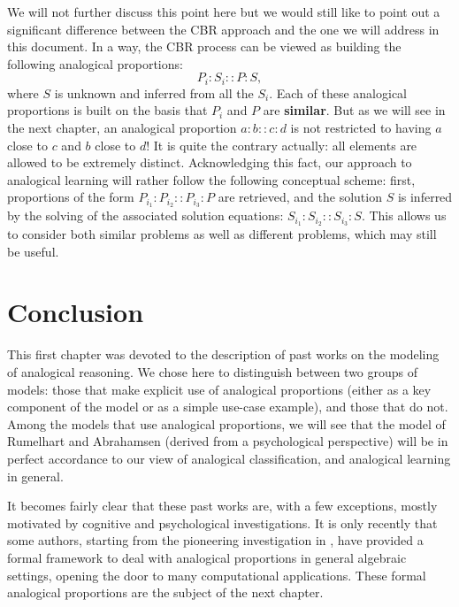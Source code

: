 We will not further discuss this point here but we would still like to point out a
significant difference between the CBR approach and the one we will address in
this document. In a way, the CBR process can be viewed as building the
following analogical proportions:
$$P_i:S_i :: P : S, $$
where $S$ is unknown and inferred from all the $S_i$. Each of these analogical
proportions is built on the basis that $P_i$ and $P$ are \textbf{similar}. But
as we will see in the next chapter, an analogical proportion $a:b::c:d$ is not
restricted to having $a$ close to $c$ and $b$ close to $d$! It is quite the
contrary actually: all elements are allowed to be extremely distinct.
Acknowledging this fact, our approach to analogical learning will rather follow
the following conceptual scheme: first, proportions of the form $P_{i_1} :
P_{i_2} :: P_{i_3} : P$ are retrieved, and the solution $S$ is inferred by the
solving of the associated solution equations: $S_{i_1} : S_{i_2} :: S_{i_3} :
S$. This allows us to consider both similar problems as well as different
problems, which may still be useful.

\section*{Conclusion}

This first chapter was devoted to the description of past works on the modeling
of analogical reasoning. We chose here to distinguish between two groups of
models: those that make explicit use of analogical proportions (either as a key
component of the model or as a simple use-case example), and those that do not.
Among the models that use analogical proportions, we will see that the model
of Rumelhart and Abrahamsen (derived from a psychological perspective) will be
in perfect accordance to our view of analogical classification, and analogical
learning in general.

It becomes fairly clear that these past works are, with a few exceptions,
mostly motivated by cognitive and psychological investigations. It is only recently
that some authors, starting from the pioneering investigation in \cite{Lep04},
have provided a formal framework to deal with analogical proportions in general
algebraic settings, opening the door to many computational applications. These
formal analogical proportions are the subject of the next chapter.



